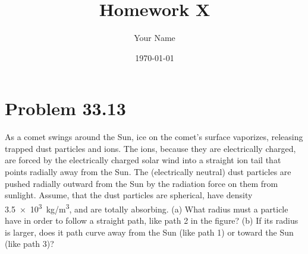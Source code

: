 \documentclass[12pt]{article}
\begin{document}
\title{Homework X}
\author{Your Name}
\date{\today}

\maketitle

\section*{Problem 33.13}
As a comet swings around the Sun, ice on the comet's surface vaporizes, releasing trapped dust particles and ions.  The ions, because they are electrically charged, are forced by the electrically charged solar wind into a straight ion tail that points radially away from the Sun.  The (electrically neutral) dust particles are pushed radially outward from the Sun by the radiation force on them from sunlight.  Assume, that the dust particles are spherical, have density \SI{3.5e3}{\kg/\m^3}, and are totally absorbing.  (a) What radius must a particle have in order to follow a straight path, like path 2 in the figure?  (b) If its radius is larger, does it path curve away from the Sun (like path 1) or toward the Sun (like path 3)?
\end{document}
